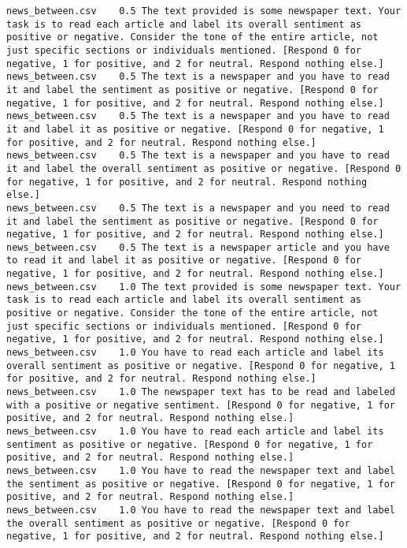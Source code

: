 \begin{lstlisting}[label=lst:promptvariants]
news_between.csv	0.5	The text provided is some newspaper text. Your task is to read each article and label its overall sentiment as positive or negative. Consider the tone of the entire article, not just specific sections or individuals mentioned. [Respond 0 for negative, 1 for positive, and 2 for neutral. Respond nothing else.]
news_between.csv	0.5	The text is a newspaper and you have to read it and label the sentiment as positive or negative. [Respond 0 for negative, 1 for positive, and 2 for neutral. Respond nothing else.]
news_between.csv	0.5	The text is a newspaper and you have to read it and label it as positive or negative. [Respond 0 for negative, 1 for positive, and 2 for neutral. Respond nothing else.]
news_between.csv	0.5	The text is a newspaper and you have to read it and label the overall sentiment as positive or negative. [Respond 0 for negative, 1 for positive, and 2 for neutral. Respond nothing else.]
news_between.csv	0.5	The text is a newspaper and you need to read it and label the sentiment as positive or negative. [Respond 0 for negative, 1 for positive, and 2 for neutral. Respond nothing else.]
news_between.csv	0.5	The text is a newspaper article and you have to read it and label it as positive or negative. [Respond 0 for negative, 1 for positive, and 2 for neutral. Respond nothing else.]
news_between.csv	1.0	The text provided is some newspaper text. Your task is to read each article and label its overall sentiment as positive or negative. Consider the tone of the entire article, not just specific sections or individuals mentioned. [Respond 0 for negative, 1 for positive, and 2 for neutral. Respond nothing else.]
news_between.csv	1.0	You have to read each article and label its overall sentiment as positive or negative. [Respond 0 for negative, 1 for positive, and 2 for neutral. Respond nothing else.]
news_between.csv	1.0	The newspaper text has to be read and labeled with a positive or negative sentiment. [Respond 0 for negative, 1 for positive, and 2 for neutral. Respond nothing else.]
news_between.csv	1.0	You have to read each article and label its sentiment as positive or negative. [Respond 0 for negative, 1 for positive, and 2 for neutral. Respond nothing else.]
news_between.csv	1.0	You have to read the newspaper text and label the sentiment as positive or negative. [Respond 0 for negative, 1 for positive, and 2 for neutral. Respond nothing else.]
news_between.csv	1.0	You have to read the newspaper text and label the overall sentiment as positive or negative. [Respond 0 for negative, 1 for positive, and 2 for neutral. Respond nothing else.]

\end{lstlisting}
